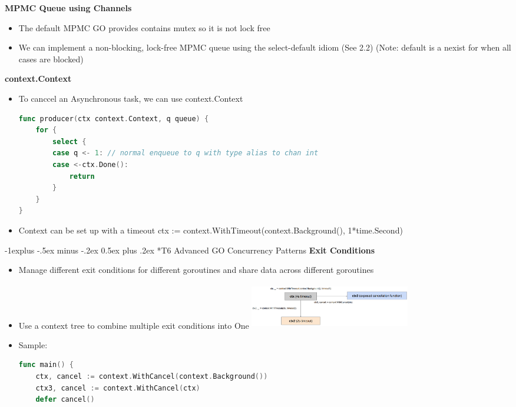 \documentclass[10pt, landscape]{article}
\makeatletter
\renewcommand{\subsection}{\@startsection{subsection}{2}{0mm}%
                                {-1explus -.5ex minus -.2ex}%
                                {0.5ex plus .2ex}%
                                {\normalfont\normalsize\bfseries}}
\makeatother
\begin{document}
\begin{multicols}{4}
\textbf{MPMC Queue using Channels} \\

\begin{itemize}
    \item The default MPMC GO provides contains mutex so it is not lock free
    \item We can implement a non-blocking, lock-free MPMC queue using the select-default idiom (See 2.2) (Note: default is a nexist for when all cases are blocked) 
\end{itemize}

\textbf{context.Context} \\
\begin{itemize}
    \item To canccel an Asynchronous task, we can use context.Context

    \begin{lstlisting}[language=Go,  breaklines=true, breakatwhitespace=true] 
func producer(ctx context.Context, q queue) {
    for {
        select {
        case q <- 1: // normal enqueue to q with type alias to chan int
        case <-ctx.Done():
            return
        }
    }
}
    \end{lstlisting}
    \item Context can be set up with a timeout ctx := context.WithTimeout(context.Background(), 1*time.Second)
\end{itemize}

\subsection*{T6 Advanced GO Concurrency Patterns}
\textbf{Exit Conditions} \\
\begin{itemize}
    \item Manage different exit conditions for different goroutines and share data across different goroutines
    \item Use a context tree to combine multiple exit conditions into One
    \includegraphics*[width = 7cm, height = 2cm]{contextTree.png}
    \item Sample: 
\begin{lstlisting}[language=Go,  breaklines=true, breakatwhitespace=true]
func main() {
    ctx, cancel := context.WithCancel(context.Background())
    ctx3, cancel := context.WithCancel(ctx)
    defer cancel()


\end{lstlisting}
\end{itemize}
\end{multicols}
\end{document}

